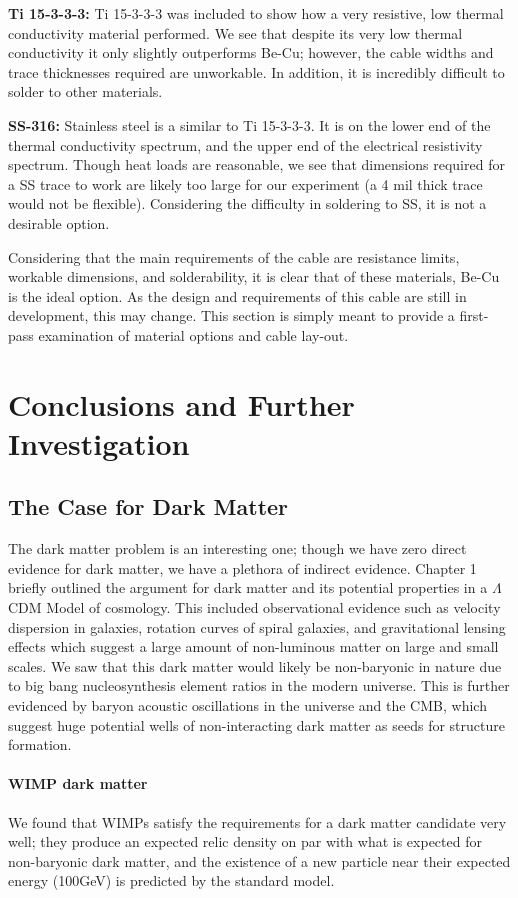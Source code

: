 \documentclass{report}
\begin{document}
\textbf{Ti 15-3-3-3:} Ti 15-3-3-3 was included to show how a very resistive, low thermal conductivity material performed. We see that despite its very low thermal conductivity it only slightly outperforms Be-Cu; however, the cable widths and trace thicknesses required are unworkable. In addition, it is incredibly difficult to solder to other materials.

\textbf{SS-316:} Stainless steel is a similar to Ti 15-3-3-3. It is on the lower end of the thermal conductivity spectrum, and the upper end of the electrical resistivity spectrum. Though heat loads are reasonable, we see that dimensions required for a SS trace to work are likely too large for our experiment (a 4 mil thick trace would not be flexible). Considering the difficulty in soldering to SS, it is not a desirable option.

Considering that the main requirements of the cable are resistance limits, workable dimensions, and solderability, it is clear that of these materials, Be-Cu is the ideal option. As the design and requirements of this cable are still in development, this may change. This section is simply meant to provide a first-pass examination of material options and cable lay-out.

\chapter{Conclusions and Further Investigation}

\section{The Case for Dark Matter}
The dark matter problem is an interesting one; though we have zero direct evidence for dark matter, we have a plethora of indirect evidence. Chapter 1 briefly outlined the argument for dark matter and its potential properties in a $\Lambda$CDM Model of cosmology. This included observational evidence such as velocity dispersion in galaxies, rotation curves of spiral galaxies, and gravitational lensing effects which suggest a large amount of non-luminous matter on large and small scales. We saw that this dark matter would likely be non-baryonic in nature due to big bang nucleosynthesis element ratios in the modern universe. This is further evidenced by baryon acoustic oscillations in the universe and the CMB, which suggest huge potential wells of non-interacting dark matter as seeds for structure formation.

\subsubsection{WIMP dark matter}
We found that WIMPs satisfy the requirements for a dark matter candidate very well; they produce an expected relic density on par with what is expected for non-baryonic dark matter, and the existence of a new particle near their expected energy (100GeV) is predicted by the standard model.
\end{document}
